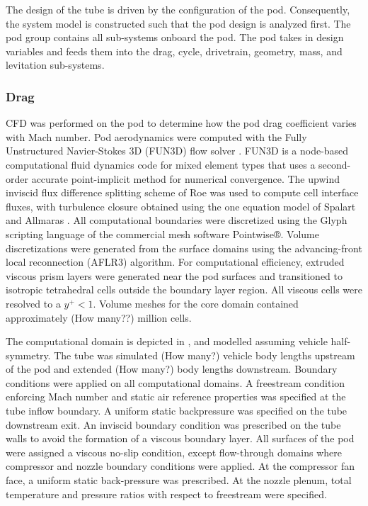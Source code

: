 
	 The design of the tube is driven by the configuration of the pod.
	 Consequently, the system model is constructed such that the pod design is analyzed first.
	 The pod group contains all sub-systems onboard the pod.
	 The pod takes in design variables and feeds them into the drag, cycle,
	 drivetrain, geometry, mass, and levitation sub-systems.

\subsubsection{Drag}
	CFD was performed on the pod to determine how the pod drag coefficient varies with Mach number.
	Pod aerodynamics were computed with the Fully Unstructured Navier-Stokes 3D
	(FUN3D) flow solver \cite{Biedron}. FUN3D is a node-based computational fluid dynamics
	code for mixed element types that uses a second-order accurate point-implicit
	method for numerical convergence. The upwind inviscid flux difference
	splitting scheme of Roe \cite{Roe} was used to compute cell interface fluxes,
	with turbulence closure obtained using the one equation model of Spalart
	and Allmaras \cite{Spalart}.
	All computational boundaries were discretized using the Glyph scripting
	language of the commercial mesh software Pointwise®. Volume discretizations
	were generated from the surface domains using the advancing-front local
	reconnection (AFLR3)\cite{Marcum} algorithm. For computational efficiency, extruded
	viscous prism layers were generated near the pod surfaces and transitioned
	to isotropic tetrahedral cells outside the boundary layer region.
	All viscous cells were resolved to a $y^{+} < 1$. Volume meshes for the core
	domain contained approximately (How many??) million cells.

	The computational domain is depicted in ,
	and modelled assuming vehicle half-symmetry.
	The tube was simulated (How many?) vehicle body lengths upstream of the pod
	and extended (How many?) body lengths downstream. Boundary conditions were
	applied on all computational domains. A freestream condition enforcing Mach
	number and static air reference properties was specified at the tube inflow boundary.
	A uniform static backpressure was specified on the tube downstream exit.
	An inviscid boundary condition was prescribed on the tube walls to avoid
	the formation of a viscous boundary layer. All surfaces of the pod were
	assigned a viscous no-slip condition, except flow-through domains where
	compressor and nozzle boundary conditions were applied. At the compressor
	fan face, a uniform static back-pressure was prescribed. At the nozzle plenum,
	total temperature and pressure ratios with respect to freestream were specified.

